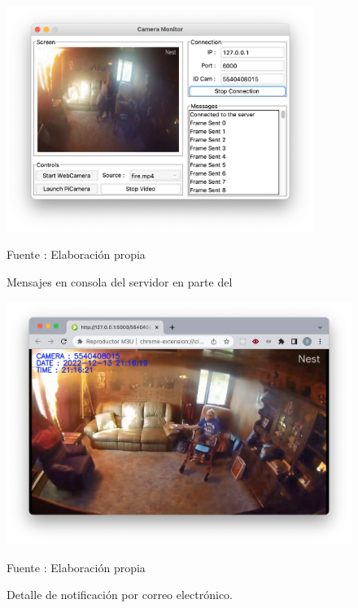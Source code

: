 \begin{figure}[H]
    \begin{center}
        \includegraphics[width=10cm]{img/capitulo_6/stream.png}
        \caption{Mensajes en consola del servidor en parte del}
        Fuente : Elaboración propia
    \end{center}
\end{figure}

\begin{figure}[H]
    \begin{center}
        \includegraphics[width=15cm]{img/capitulo_6/stream_web.png}
        \caption{Detalle de notificación por correo electrónico.}
        Fuente : Elaboración propia
    \end{center}
\end{figure}
